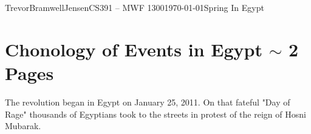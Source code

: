 \documentclass[12pt,letterpaper]{article}
\begin{document}
\begin{mla}{Trevor}{Bramwell}{Jensen}{CS391 -- MWF 1300}{\today}{Spring In Egypt}

%
%
%

\section{Chonology of Events in Egypt $\sim$ 2 Pages}
The revolution began in Egypt on January 25, 2011. On that fateful "Day of
Rage" thousands of Egyptians took to the streets in protest of the reign of
Hosni Mubarak.


\end{mla}
\end{document}
